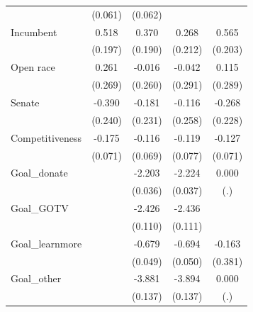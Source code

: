 \begin{tabular}{l*{4}{c}}
                    &     (0.061)         &     (0.062)         &                     &                     \\
Incumbent                   &       0.518\sym{**} &       0.370         &       0.268         &       0.565\sym{**} \\
                    &     (0.197)         &     (0.190)         &     (0.212)         &     (0.203)         \\
Open race                   &       0.261         &      -0.016         &      -0.042         &       0.115         \\
                    &     (0.269)         &     (0.260)         &     (0.291)         &     (0.289)         \\
Senate              &      -0.390         &      -0.181         &      -0.116         &      -0.268         \\
                    &     (0.240)         &     (0.231)         &     (0.258)         &     (0.228)         \\
Competitiveness &      -0.175\sym{*}  &      -0.116         &      -0.119         &      -0.127         \\
                    &     (0.071)         &     (0.069)         &     (0.077)         &     (0.071)         \\
Goal\_donate              &                     &      -2.203\sym{***}&      -2.224\sym{***}&       0.000         \\
                    &                     &     (0.036)         &     (0.037)         &         (.)         \\
Goal\_GOTV                &                     &      -2.426\sym{***}&      -2.436\sym{***}&                     \\
                    &                     &     (0.110)         &     (0.111)         &                     \\
Goal\_learnmore           &                     &      -0.679\sym{***}&      -0.694\sym{***}&      -0.163         \\
                    &                     &     (0.049)         &     (0.050)         &     (0.381)         \\
Goal\_other               &                     &      -3.881\sym{***}&      -3.894\sym{***}&       0.000         \\
                    &                     &     (0.137)         &     (0.137)         &         (.)         \\

\end{tabular}
